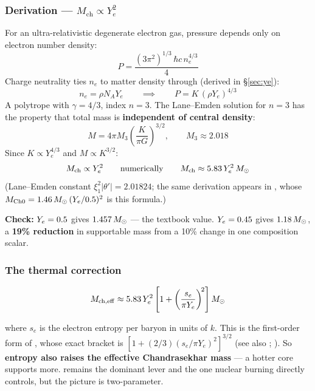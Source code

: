 \subsubsection{Derivation --- \texorpdfstring{$M_{\mathrm{ch}} \propto Y_e^2$}{Mch propto Ye2}}
\label{sec:mchderivation}

For an ultra-relativistic degenerate electron gas, pressure depends only on
electron number density:
%
\begin{equation}
P = \frac{(3\pi^2)^{1/3}\,\hbar c\, n_e^{4/3}}{4}
\label{eq:urel-eos}
\end{equation}
%
Charge neutrality ties $n_e$ to matter density through \Ye{} (derived in
\S\ref{sec:ye}):
%
\begin{equation*}
n_e = \rho N_A Y_e \qquad \implies \qquad P = K\,(\rho Y_e)^{4/3}
\end{equation*}
%
A polytrope with $\gamma = 4/3$, index $n = 3$. The Lane--Emden solution for
$n = 3$ has the property that total mass is \textbf{independent of central
density}:
%
\begin{equation*}
M = 4\pi M_3\left(\frac{K}{\pi G}\right)^{3/2}, \qquad M_3 \approx 2.018
\end{equation*}
%
Since $K \propto Y_e^{4/3}$ and $M \propto K^{3/2}$:
%
\begin{equation}
M_{\mathrm{ch}} \propto Y_e^2 \qquad \text{numerically} \qquad
M_{\mathrm{ch}} \approx 5.83\,Y_e^2\,M_{\odot}
\label{eq:mch}
\end{equation}
%
(Lane--Emden constant $\xi_1^2|\theta'| = 2.01824$; the same derivation appears
in \citealt{suwa2018}, whose $M_{\mathrm{Ch}0} = 1.46\,M_{\odot}\,(Y_{e}/0.5)^2$ is
this formula.)

\textbf{Check:} $Y_{e} = 0.5$ gives $1.457\,M_{\odot}$ --- the textbook value.
$Y_{e} = 0.45$ gives $1.18\,M_{\odot}$, a \textbf{19\% reduction} in supportable mass
from a 10\% change in one composition scalar.

\subsubsection{The thermal correction}
\label{sec:thermalcorrection}

\begin{equation*}
M_{\mathrm{ch,eff}} \approx
5.83\,Y_e^2\left[1 + \left(\frac{s_e}{\pi Y_e}\right)^{\!2}\right]M_{\odot}
\end{equation*}

where $s_e$ is the electron entropy per baryon in units of $k$. This is the
first-order form of \citet{baron1990}, whose exact bracket is
$[1 + (2/3)(s_e/\pi Y_e)^2]^{3/2}$ (see also \citealt{timmes1996};
\citealt{suwa2018}). So \textbf{entropy also raises the effective
Chandrasekhar mass} --- a hotter core supports more. \Ye{} remains the dominant
lever and the one nuclear burning directly controls, but the picture is
two-parameter.

